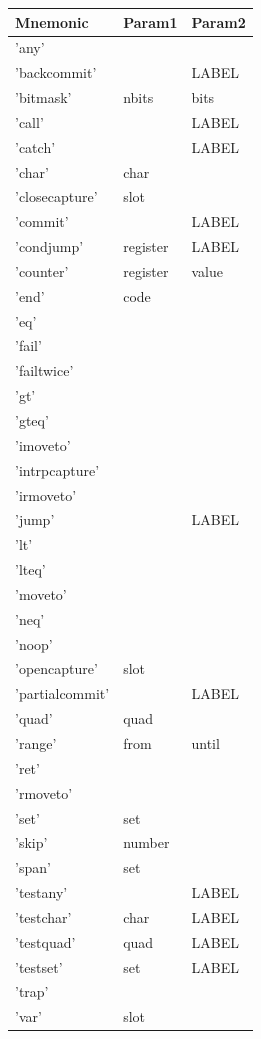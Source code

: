 
\begin{center}
\label{tab:naig_assembly}
\begin{longtable}{lll}
\textbf{Mnemonic} & \textbf{Param1} & \textbf{Param2} \\
\endhead
'any' &  &  \\
'backcommit' &  & LABEL \\
'bitmask' & nbits & bits \\
'call' &  & LABEL \\
'catch' &  & LABEL \\
'char' & char &  \\
'closecapture' & slot &  \\
'commit' &  & LABEL \\
'condjump' & register & LABEL \\
'counter' & register & value \\
'end' & code &  \\
'eq' &  &  \\
'fail' &  &  \\
'failtwice' &  &  \\
'gt' &  &  \\
'gteq' &  &  \\
'imoveto' &  &  \\
'intrpcapture' &  &  \\
'irmoveto' &  &  \\
'jump' &  & LABEL \\
'lt' &  &  \\
'lteq' &  &  \\
'moveto' &  &  \\
'neq' &  &  \\
'noop' &  &  \\
'opencapture' & slot &  \\
'partialcommit' &  & LABEL \\
'quad' & quad &  \\
'range' & from & until \\
'ret' &  &  \\
'rmoveto' &  &  \\
'set' & set &  \\
'skip' & number &  \\
'span' & set &  \\
'testany' &  & LABEL \\
'testchar' & char & LABEL \\
'testquad' & quad & LABEL \\
'testset' & set & LABEL \\
'trap' &  &  \\
'var' & slot &  \\
\end{longtable}
\end{center}
